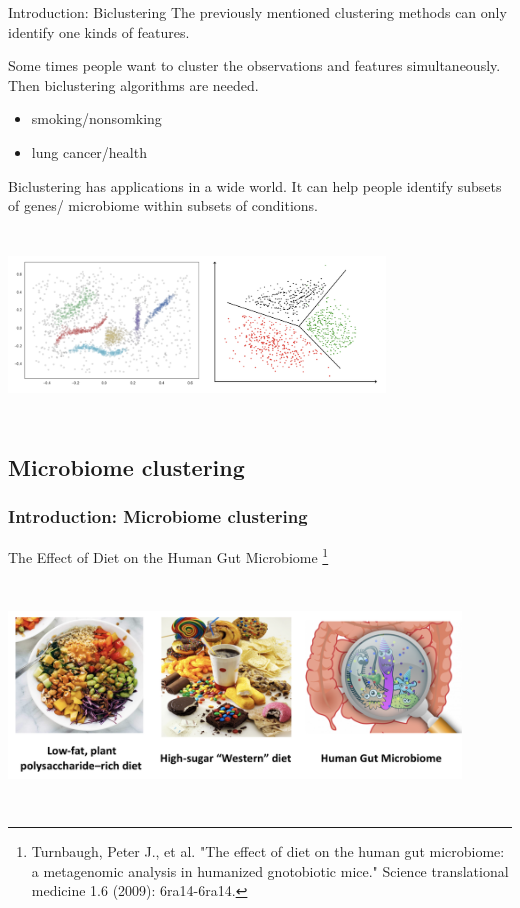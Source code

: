 \documentclass{beamer}
\begin{document}
\begin{frame}{Introduction: Biclustering}
    The previously mentioned clustering methods can only identify one kinds of features. 
    
    Some times people want to cluster the observations and features simultaneously. Then biclustering algorithms are needed. 
    
    \begin{itemize}
        \item smoking/nonsomking
        \item lung cancer/health
    \end{itemize}
    
    Biclustering has applications in a wide world. It can help people identify subsets of genes/ microbiome within subsets of conditions.
    
    \centering
    \includegraphics[width=10cm,height=5cm,keepaspectratio]{cluster}
    
\end{frame}

\subsection{Microbiome clustering}
\begin{frame}
\frametitle{Introduction: Microbiome clustering}

The Effect of Diet on the Human Gut Microbiome \footnote{Turnbaugh, Peter J., et al. "The effect of diet on the human gut microbiome: a metagenomic analysis in humanized gnotobiotic mice." Science translational medicine 1.6 (2009): 6ra14-6ra14.}

\vfill

  \centering
    \includegraphics[width=12cm,height=6cm,keepaspectratio]{diet}
    
\end{frame}
\end{document}
